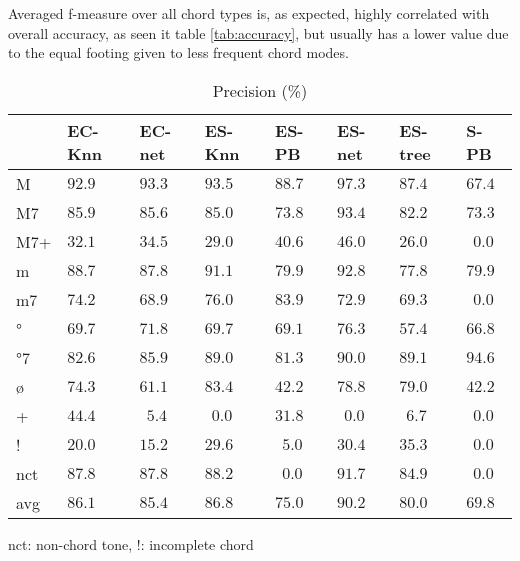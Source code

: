 \documentclass{article}
\begin{document}
Averaged f-measure over all chord types is, as expected, highly
correlated with overall accuracy, as seen it table \ref{tab:accuracy},
but usually has a lower value due to the equal footing given to less
frequent chord modes.

\begin{table}
  \centering
  \begin{tabular}{l|p{.5cm}p{.5cm}p{.5cm}p{.5cm}p{.5cm}p{.5cm}p{.5cm}}
   & EC-Knn&EC-net &ES-Knn &ES-PB  &ES-net &ES-tree&S-PB     \\
\hline                                             
M  &$ 92.9$&$ 93.3$&$ 93.5$&$ 88.7$&$ 97.3$&$ 87.4$&$ 67.4$  \\
M7 &$ 85.9$&$ 85.6$&$ 85.0$&$ 73.8$&$ 93.4$&$ 82.2$&$ 73.3$  \\
M7+&$ 32.1$&$ 34.5$&$ 29.0$&$ 40.6$&$ 46.0$&$ 26.0$&$~~0.0$  \\
m  &$ 88.7$&$ 87.8$&$ 91.1$&$ 79.9$&$ 92.8$&$ 77.8$&$ 79.9$  \\
m7 &$ 74.2$&$ 68.9$&$ 76.0$&$ 83.9$&$ 72.9$&$ 69.3$&$~~0.0$  \\
°  &$ 69.7$&$ 71.8$&$ 69.7$&$ 69.1$&$ 76.3$&$ 57.4$&$ 66.8$  \\
°7 &$ 82.6$&$ 85.9$&$ 89.0$&$ 81.3$&$ 90.0$&$ 89.1$&$ 94.6$  \\
ø  &$ 74.3$&$ 61.1$&$ 83.4$&$ 42.2$&$ 78.8$&$ 79.0$&$ 42.2$  \\
+  &$ 44.4$&$~~5.4$&$~~0.0$&$ 31.8$&$~~0.0$&$~~6.7$&$~~0.0$  \\
!  &$ 20.0$&$ 15.2$&$ 29.6$&$~~5.0$&$ 30.4$&$ 35.3$&$~~0.0$  \\
nct&$ 87.8$&$ 87.8$&$ 88.2$&$~~0.0$&$ 91.7$&$ 84.9$&$~~0.0$  \\
avg&$ 86.1$&$ 85.4$&$ 86.8$&$ 75.0$&$ 90.2$&$ 80.0$&$ 69.8$  \\

  \end{tabular}

\medskip

nct: non-chord tone, !: incomplete chord

  \caption{Precision (\%)}
  \label{tab:precision}
\end{table}
\end{document}

